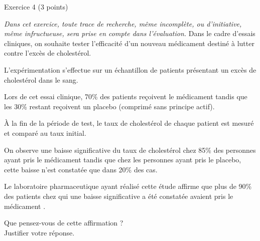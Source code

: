 
%
\begin{h2}Exercice 4 (3 points)\end{h2}
\par
\textit{Dans cet exercice, toute trace de recherche, même incomplète, ou d'initiative, même infructueuse, sera prise en compte dans l'évaluation.}
\medskip
Dans le cadre d'essais cliniques, on souhaite tester l'efficacité d'un nouveau médicament destiné à lutter contre l'excès de cholestérol.
\par
L'expérimentation s'effectue sur un échantillon de patients présentant un excès de cholestérol dans le sang.
\par
Lors de cet essai clinique, 70\% des patients reçoivent le médicament tandis que les 30\% restant reçoivent un placebo (comprimé sans principe actif).
\par
\`A la fin de la période de test, le taux de cholestérol de chaque patient est mesuré et comparé au taux initial.
\par
On observe une baisse significative du taux de cholestérol chez 85\% des personnes ayant pris le médicament tandis que chez les personnes ayant pris le placebo, cette baisse n'est constatée que dans 20\% des cas.
\par
Le laboratoire pharmaceutique ayant réalisé cette étude affirme que \og plus de 90\% des patients chez qui une baisse significative a été constatée avaient pris le médicament \fg{}.
\par
Que pensez-vous de cette affirmation ? \\
Justifier votre réponse.
